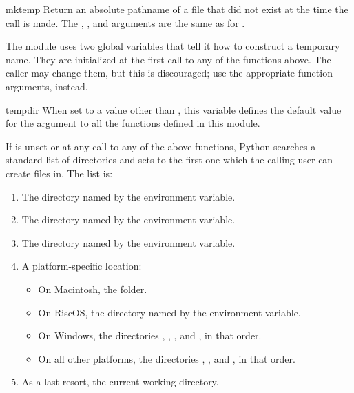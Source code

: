 \begin{funcdesc}{mktemp}{
			 }
Return an absolute pathname of a file that did not exist at the time
the call is made.  The , , and 
arguments are the same as for .

\end{funcdesc}

The module uses two global variables that tell it how to construct a
temporary name.  They are initialized at the first call to any of the
functions above.  The caller may change them, but this is discouraged;
use the appropriate function arguments, instead.

\begin{datadesc}{tempdir}
When set to a value other than , this variable defines the
default value for the  argument to all the functions defined
in this module.

If  is unset or  at any call to any of the
above functions, Python searches a standard list of directories and
sets  to the first one which the calling user can create
files in.  The list is:

\begin{enumerate}
\item The directory named by the  environment variable.
\item The directory named by the  environment variable.
\item The directory named by the  environment variable.
\item A platform-specific location:
    \begin{itemize}
    \item On Macintosh, the  folder.
    \item On RiscOS, the directory named by the
           environment variable.
    \item On Windows, the directories
          ,
          ,
          , and
          , in that order.
    \item On all other platforms, the directories
          , , and , in that order.
    \end{itemize}
\item As a last resort, the current working directory.
\end{enumerate}
\end{datadesc}

